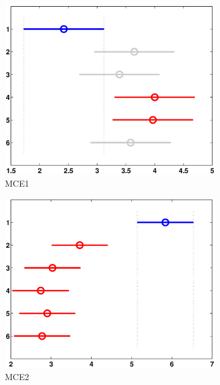\begin{figure}
	\centering
	\begin{subfigure}[b]{0.49\linewidth}
		\includegraphics[width=\linewidth]{Figures/C-Bonferroni_HNMED_VS_ED1}
		\caption{MCE1} \label{fig:Bon_M1} 
	\end{subfigure}
	\begin{subfigure}[b]{0.49\linewidth}
		\includegraphics[width=\textwidth]{Figures/C-Bonferroni_HNMED_VS_ED2}
		\caption{MCE2} \label{fig:Bon_M2} 
	\end{subfigure}
	\begin{subfigure}[b]{0.49\linewidth}

\end{subfigure}
\end{figure}

